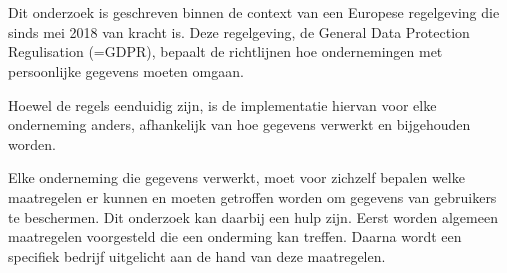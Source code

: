 
%
%

%



\chapter*{}

Dit onderzoek is geschreven binnen de context van een Europese regelgeving die sinds mei 2018 van kracht is. Deze regelgeving, de General Data Protection Regulisation (=GDPR), bepaalt de richtlijnen hoe ondernemingen met persoonlijke gegevens moeten omgaan. 

Hoewel de regels eenduidig zijn, is de implementatie hiervan voor elke onderneming anders, afhankelijk van hoe gegevens verwerkt en bijgehouden worden. 

Elke onderneming die gegevens verwerkt, moet voor zichzelf bepalen welke maatregelen er kunnen en moeten getroffen worden om gegevens van gebruikers te beschermen. Dit onderzoek kan daarbij een hulp zijn. Eerst worden algemeen maatregelen voorgesteld die een onderming kan treffen. Daarna wordt een specifiek bedrijf uitgelicht aan de hand van deze maatregelen.


